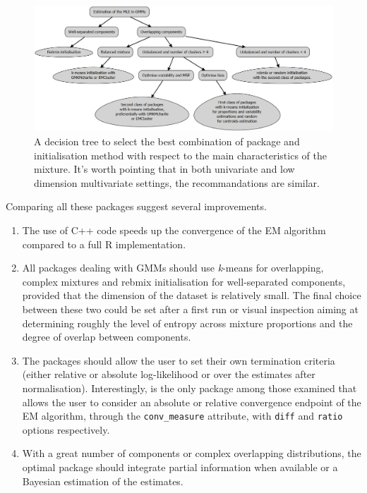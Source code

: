 \begin{figure}

{\centering \includegraphics[width=1\linewidth]{./figs/decision_tree_GMMs} 

}

\caption{A decision tree to select the best combination of package and initialisation method with respect to the main characteristics of the mixture. It's worth pointing that in both univariate and low dimension multivariate settings, the recommandations are similar.}\label{fig:decision-tree-GMMs}
\end{figure}

Comparing all these packages suggest several improvements.

\begin{enumerate}
\def\labelenumi{\arabic{enumi}.}
\item
  The use of C++ code speeds up the convergence of the EM algorithm
  compared to a full R implementation.
\item
  All packages dealing with GMMs should use \emph{k}-means for overlapping, complex mixtures and rebmix initialisation for well-separated components, provided that the dimension of the dataset is relatively small. The final choice between these two could be set after a first run or visual inspection aiming at determining roughly the level of entropy across mixture proportions and the degree of overlap between components.
\item
  The packages should allow the user to set their own termination criteria (either relative or absolute log-likelihood or over the estimates after normalisation). Interestingly,  is the only package among those examined that allows the user to consider an absolute or relative convergence endpoint of the EM algorithm, through the \texttt{conv\_measure} attribute, with \texttt{diff} and \texttt{ratio} options respectively.
\item
  With a great number of components or complex overlapping distributions, the optimal package should integrate partial information when available or a Bayesian estimation of the
  estimates.
\end{enumerate}

